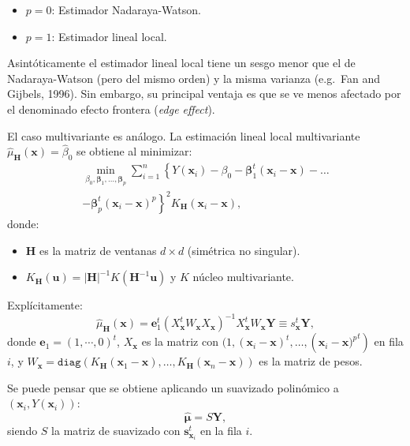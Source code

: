 \documentclass[
]{book}
\theoremstyle{definition}
\theoremstyle{definition}
\theoremstyle{definition}
\theoremstyle{remark}
\begin{document}
\begin{itemize}
\item
  \(p=0\): Estimador Nadaraya-Watson.
\item
  \(p=1\): Estimador lineal local.
\end{itemize}

Asintóticamente el estimador lineal local tiene un sesgo menor que el de
Nadaraya-Watson (pero del mismo orden) y la misma varianza (e.g.~Fan and Gijbels, 1996).
Sin embargo, su principal ventaja es que se ve menos afectado por el denominado
efecto frontera (\emph{edge effect}).

El caso multivariante es análogo. La estimación lineal local multivariante
\(\hat{\mu}_{\mathbf{H}}(\mathbf{x})=\hat{\beta}_0\) se obtiene al minimizar:
\[\begin{aligned}
    \min_{\beta_0 ,\boldsymbol{\beta}_1, \ldots, \boldsymbol{\beta}_p}
    \sum_{i=1}^{n}\left\{ Y(\mathbf{x}_{i})-\beta_0 
    -\boldsymbol{\beta}_1^t(\mathbf{x}_{i}-\mathbf{x}) - \ldots \right. \nonumber \\
    \left. -\boldsymbol{\beta}_p^t(\mathbf{x}_{i}-\mathbf{x})^p \right\}^{2}
    K_{\mathbf{H}}(\mathbf{x}_{i}-\mathbf{x}),
\end{aligned}\]
donde:

\begin{itemize}
\item
  \(\mathbf{H}\) es la matriz de ventanas \(d\times d\) (simétrica no singular).
\item
  \(K_{\mathbf{H}}(\mathbf{u})=\left\vert \mathbf{H}\right\vert ^{-1}K(\mathbf{H}^{-1}\mathbf{u})\) y \(K\) núcleo multivariante.
\end{itemize}

Explícitamente:
\[\hat{\mu}_{\mathbf{H}}(\mathbf{x}) = \mathbf{e}_{1}^t \left(
X_{\mathbf{x}}^t {W}_{\mathbf{x}} 
X_{\mathbf{x}} \right)^{-1} X_{\mathbf{x}}^t 
{W}_{\mathbf{x}}\mathbf{Y} \equiv {s}_{\mathbf{x}}^t\mathbf{Y},\]
donde \(\mathbf{e}_{1} = \left( 1, \cdots, 0\right)^t\), \(X_{\mathbf{x}}\)
es la matriz con \((1,(\mathbf{x}_{i}-\mathbf{x})^t, \ldots, (\mathbf{x}_{i}-{\mathbf{x})^p}^t)\) en fila \(i\),
y \(W_{\mathbf{x}} = \mathtt{diag} \left( K_{\mathbf{H}}(\mathbf{x}_{1} - \mathbf{x}), \ldots, K_{\mathbf{H}}(\mathbf{x}_{n}-\mathbf{x}) \right)\)
es la matriz de pesos.

Se puede pensar que se obtiene aplicando un suavizado polinómico a
\((\mathbf{x}_i, Y(\mathbf{x}_i))\):
\[\hat{\boldsymbol{\mu}} = S\mathbf{Y},\]
siendo \(S\) la matriz de suavizado con \(\mathbf{s}_{\mathbf{x}_{i}}^t\) en la fila \(i\).
\end{document}
